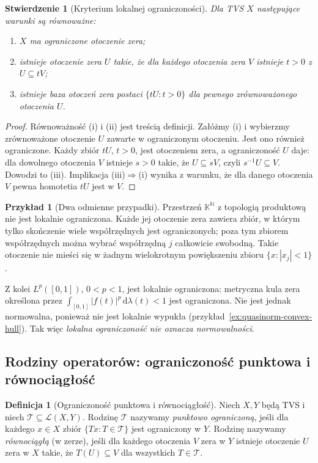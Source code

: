 \documentclass[11pt,a4paper]{article}
\numberwithin{equation}{section}
\theoremstyle{plain}
\newtheorem{stwierdzenie}[twierdzenie]{Stwierdzenie}
\theoremstyle{definition}
\newtheorem{definicja}[twierdzenie]{Definicja}
\newtheorem{przyklad}[twierdzenie]{Przykład}
\theoremstyle{remark}
\newcommand{\N}{\mathbb N}
\newcommand{\K}{\mathbb K}
\begin{document}
\begin{stwierdzenie}[Kryterium lokalnej ograniczoności]
\label{prop:locally-bounded}
Dla TVS $X$ następujące warunki są równoważne:
\begin{enumerate}[label=\textup{(\roman*)}]
\item $X$ ma ograniczone otoczenie zera;
\item istnieje otoczenie zera $U$ takie, że dla każdego
otoczenia zera $V$ istnieje $t>0$ z $U\subseteq tV$;
\item istnieje baza otoczeń zera postaci $\{tU:t>0\}$
dla pewnego zrównoważonego otoczenia $U$.
\end{enumerate}
\end{stwierdzenie}
\begin{proof}
Równoważność (i) i (ii) jest treścią definicji.
Załóżmy (i) i wybierzmy zrównoważone otoczenie
$U$ zawarte w ograniczonym otoczeniu. Jest ono również
ograniczone. Każdy zbiór $tU$, $t>0$, jest otoczeniem
zera, a ograniczoność $U$ daje: dla dowolnego otoczenia
$V$ istnieje $s>0$ takie, że $U\subseteq sV$, czyli
$s^{-1}U\subseteq V$. Dowodzi to (iii).
Implikacja (iii)$\Rightarrow$(i) wynika z warunku, że
dla danego otoczenia $V$ pewna homotetia $tU$ jest w $V$.
\end{proof}

\begin{przyklad}[Dwa odmienne przypadki]
Przestrzeń $\K^{\N}$ z topologią produktową nie jest
lokalnie ograniczona. Każde jej otoczenie zera zawiera
zbiór, w którym tylko skończenie wiele współrzędnych jest
ograniczonych; poza tym zbiorem współrzędnych można wybrać
współrzędną $j$ całkowicie swobodną. Takie otoczenie nie
mieści się w żadnym wielokrotnym powiększeniu zbioru
$\{x:|x_j|<1\}$.

Z kolei $L^p([0,1])$, $0<p<1$, jest lokalnie ograniczona:
metryczna kula zera określona przez
$\int_{[0,1]}|f(t)|^p\,\mathrm d\lambda(t)<1$ jest ograniczona.
Nie jest jednak normowalna, ponieważ nie jest lokalnie
wypukła (przykład~\ref{ex:quasinorm-convex-hull}).
Tak więc \emph{lokalna ograniczoność nie oznacza normowalności}.
\end{przyklad}

\subsection{Rodziny operatorów: ograniczoność punktowa i równociągłość}

\begin{definicja}[Ograniczoność punktowa i równociągłość]
\label{def:operator-family}
Niech $X,Y$ będą TVS i niech
$\mathcal T\subseteq\mathcal L(X,Y)$.
Rodzinę $\mathcal T$ nazywamy \emph{punktowo ograniczoną}, jeśli
dla każdego $x\in X$ zbiór $\{Tx:T\in\mathcal T\}$
jest ograniczony w $Y$. Rodzinę nazywamy
\emph{równociągłą} (w zerze), jeśli dla każdego otoczenia
$V$ zera w $Y$ istnieje otoczenie $U$ zera w $X$ takie,
że $T(U)\subseteq V$ dla wszystkich $T\in\mathcal T$.
\end{definicja}
\end{document}
